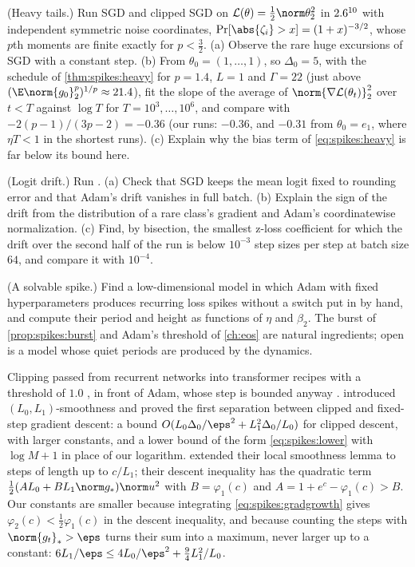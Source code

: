 \begin{refsection}
\begin{exercises}
\item \simulation (Heavy tails.) Run SGD and clipped SGD on $\Loss(\theta)=\frac12\norm\theta_2^2$ in $2.6^{10}$ with independent symmetric noise coordinates, $\Pr[\abs{\zeta_i}>x]=(1+x)^{-3/2}$, whose $p$th moments are finite exactly for $p<\frac32$. (a) Observe the rare huge excursions of SGD with a constant step. (b) From $\theta_0=(1,\dots,1)$, so $\Delta_0=5$, with the schedule of \cref{thm:spikes:heavy} for $p=1.4$, $L=1$ and $\Gamma=22$ (just above $(\E\norm{g_0}_2^p)^{1/p}\approx21.4$), fit the slope of the average of $\norm{\nabla\Loss(\theta_t)}_2^2$ over $t<T$ against $\log T$ for $T=10^3,\dots,10^6$, and compare with $-2(p-1)/(3p-2)=-0.36$ (our runs: $-0.36$, and $-0.31$ from $\theta_0=e_1$, where $\eta T<1$ in the shortest runs). (c) Explain why the bias term of \eqref{eq:spikes:heavy} is far below its bound here.\label{ex:spikes:simheavy}

\item \simulation (Logit drift.) Run . (a) Check that SGD keeps the mean logit fixed to rounding error and that Adam's drift vanishes in full batch. (b) Explain the sign of the drift from the distribution of a rare class's gradient and Adam's coordinatewise normalization. (c) Find, by bisection, the smallest z-loss coefficient for which the drift over the second half of the run is below $10^{-3}$ step sizes per step at batch size $64$, and compare it with $10^{-4}$.\label{ex:spikes:simdrift}

\item \research (A solvable spike.) Find a low-dimensional model in which Adam with fixed hyperparameters produces recurring loss spikes without a switch put in by hand, and compute their period and height as functions of $\eta$ and $\beta_2$. The burst of \cref{prop:spikes:burst} and Adam's threshold of \cref{ch:eos} are natural ingredients; open is a model whose quiet periods are produced by the dynamics.\label{ex:spikes:spike}
\end{exercises}

\notesandrefs
Clipping passed from recurrent networks \parencite{PascanuMikolovBengio2013} into transformer recipes with a threshold of $1.0$ \parencite{BrownEtAl2020,TouvronEtAl2023,ChowdheryEtAl2023}, in front of Adam, whose step is bounded anyway \parencite{KingmaBa2015}. \Textcite{ZhangHeSraJadbabaie2020} introduced $(L_0,L_1)$-smoothness and proved the first separation between clipped and fixed-step gradient descent: a bound $O(L_0\Delta_0/\eps^2+L_1^2\Delta_0/L_0)$ for clipped descent, with larger constants, and a lower bound of the form \eqref{eq:spikes:lower} with $\log M+1$ in place of our logarithm. \Textcite{ZhangJinFangWang2020} extended their local smoothness lemma to steps of length up to $c/L_1$; their descent inequality has the quadratic term $\frac12(AL_0+BL_1\norm g_*)\norm u^2$ with $B=\varphi_1(c)$ and $A=1+e^c-\varphi_1(c)>B$. Our constants are smaller because integrating \eqref{eq:spikes:gradgrowth} gives $\varphi_2(c)<\frac12\varphi_1(c)$ in the descent inequality, and because counting the steps with $\norm{g_t}_*>\eps$ turns their sum into a maximum, never larger up to a constant: $6L_1/\eps\le4L_0/\eps^2+\frac94L_1^2/L_0$.


\end{refsection}
